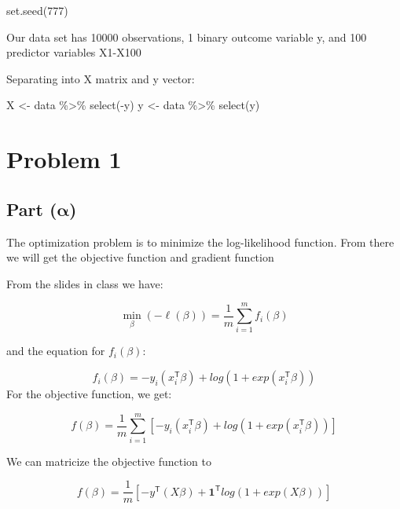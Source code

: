 \documentclass[
  letterpaper,
  DIV=11,
  numbers=noendperiod]{scrartcl}
\newenvironment{Shaded}{\begin{snugshade}}{\end{snugshade}}
\newcommand{\DecValTok}[1]{\textcolor[rgb]{0.68,0.00,0.00}{#1}}
\newcommand{\FunctionTok}[1]{\textcolor[rgb]{0.28,0.35,0.67}{#1}}
\newcommand{\NormalTok}[1]{\textcolor[rgb]{0.00,0.23,0.31}{#1}}
\newcommand{\OtherTok}[1]{\textcolor[rgb]{0.00,0.23,0.31}{#1}}
\newcommand{\SpecialCharTok}[1]{\textcolor[rgb]{0.37,0.37,0.37}{#1}}
\begin{document}
\begin{Shaded}
\begin{Highlighting}[]
\FunctionTok{set.seed}\NormalTok{(}\DecValTok{777}\NormalTok{)}
\end{Highlighting}
\end{Shaded}

Our data set has 10000 observations, 1 binary outcome variable y, and
100 predictor variables X1-X100

Separating into X matrix and y vector:

\begin{Shaded}
\begin{Highlighting}[]
\NormalTok{X }\OtherTok{\textless{}{-}}\NormalTok{ data }\SpecialCharTok{\%\textgreater{}\%}
  \FunctionTok{select}\NormalTok{(}\SpecialCharTok{{-}}\NormalTok{y)}
\NormalTok{y }\OtherTok{\textless{}{-}}\NormalTok{ data }\SpecialCharTok{\%\textgreater{}\%}
  \FunctionTok{select}\NormalTok{(y)}
\end{Highlighting}
\end{Shaded}

\section{Problem 1}\label{problem-1}

\subsection{\texorpdfstring{Part
(\(\symbf{\alpha}\))}{Part (\textbackslash symbf\{\textbackslash alpha\})}}\label{part-symbfalpha}

The optimization problem is to minimize the log-likelihood function.
From there we will get the objective function and gradient function

From the slides in class we have:

\[
\min_{\beta} (-\ell(\beta)) = \frac{1}{m} \sum_{i=1}^{m} f_i(\beta)
\]

and the equation for \(f_i(\beta)\):

\[
f_i(\beta) = -y_i(x_i^{\mathsf{T}}\beta) + log(1 + exp(x_i^{\mathsf{T}} \beta))
\] For the objective function, we get:

\[
f(\beta) = \frac{1}{m} \sum_{i=1}^{m} [-y_i(x_i^{\mathsf{T}}\beta) + log(1 + exp(x_i^{\mathsf{T}} \beta))]
\]

We can matricize the objective function to

\[
\boxed{f(\beta) = \frac{1}{m}[-y^{\mathsf{T}}(X\beta) + \mathbf{1}^{\mathsf{T}}log(1 + exp(X\beta))]}
\]
\end{document}
